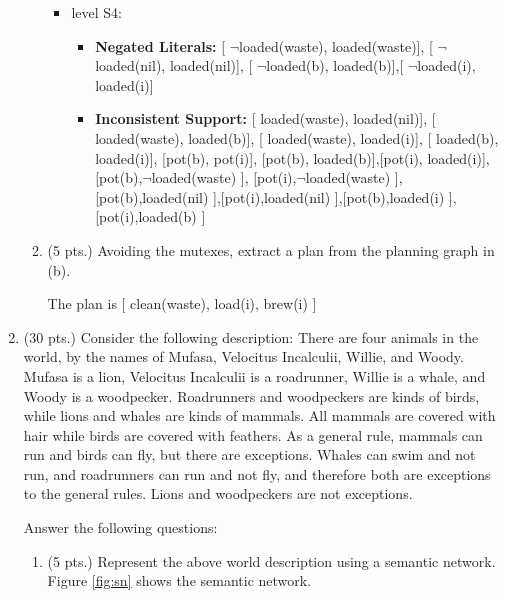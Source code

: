 \documentclass{article}%
\begin{document}
\begin{enumerate}
\begin{enumerate}
\begin{itemize}
\begin{itemize}
			\end{itemize}
	\item  level S4:
  			\begin{itemize}
 				 \item \textbf{Negated Literals:} [ $\neg$loaded(waste), loaded(waste)], [ $\neg$loaded(nil), loaded(nil)],
 				 [ $\neg$loaded(b), loaded(b)],[ $\neg$loaded(i), loaded(i)]
 				 \item \textbf{Inconsistent Support:}  [ loaded(waste), loaded(nil)], [ loaded(waste), loaded(b)], [ loaded(waste), loaded(i)], 
 				 [ loaded(b), loaded(i)], [pot(b), pot(i)], [pot(b), loaded(b)],[pot(i), loaded(i)],[pot(b),$\neg$loaded(waste) ],
 				 [pot(i),$\neg$loaded(waste) ],[pot(b),loaded(nil) ],[pot(i),loaded(nil) ],[pot(b),loaded(i) ],[pot(i),loaded(b) ]
			\end{itemize}

  \end{itemize}
  
  \item (5 pts.) Avoiding the mutexes, extract a plan from the planning graph in (b).
  
  The plan is [ clean(waste), load(i), brew(i) ]
  
\end{enumerate} 	

 	\item (30 pts.) Consider the following description: There are four animals in the world, by the names of Mufasa, Velocitus Incalculii, Willie, and Woody. Mufasa is a lion, Velocitus Incalculii is a roadrunner, Willie is a whale, and Woody is a woodpecker. Roadrunners and woodpeckers are kinds of birds, while lions and whales are kinds of mammals. All mammals are covered with hair while birds are covered with feathers. As a general rule, mammals can run and birds can fly, but there are exceptions. Whales can swim and not run, and roadrunners can run and not fly, and therefore both are exceptions to the general rules. Lions and woodpeckers are not exceptions. 

Answer the following questions:
	\begin{enumerate}
		\item (5 pts.) Represent the above world description using a semantic network. \\
		
		Figure \ref{fig:sn} shows the semantic network.
		

\end{enumerate}
\end{enumerate}
\end{document}
